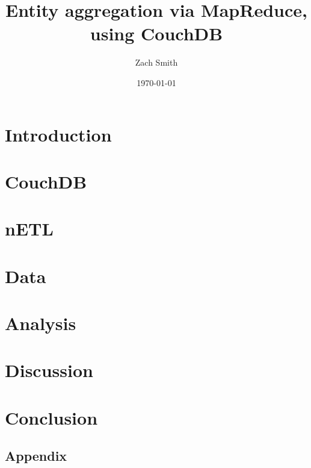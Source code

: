 \documentclass[
    parskip=full,
    a4paper
]{scrartcl}
\title{Entity aggregation via MapReduce, using CouchDB}
\author{Zach Smith}
\date{\today}
\begin{document}
\maketitle
\thispagestyle{empty}

\begin{abstract}
    
\end{abstract}
\newpage

\tableofcontents
\newpage

\section{Introduction}




\section{CouchDB}


\section{nETL}




\section{Data}






\section{Analysis}


\section{Discussion}


\section{Conclusion}



\newpage




\begin{appendix}
    \section{Appendix}
    
    
    
    
    
    \listoffigures
    \listoftables
\end{appendix}
\newpage

\end{document}
